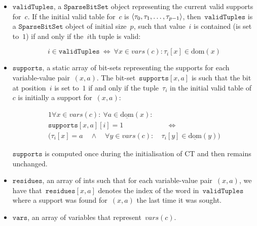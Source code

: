 \documentclass[a4paper,11pt]{article}
\newcommand{\Dom}[1]{\text{dom}({#1})}
\newcommand{\Dominit}[1]{\underline{\text{dom}}(#1)}
\newcommand{\SparseBitSet}{\texttt{SparseBitSet}}
\newcommand{\CurrTable}{\texttt{validTuples}}
\newcommand{\Supports}{\texttt{supports}}
\newcommand{\Residues}{\texttt{residues}}
\newcommand{\Vars}{\texttt{vars}}
\numberwithin{equation}{section}
\begin{document}
\begin{itemize}
  
  \item $\CurrTable$, a $\SparseBitSet$ object representing the current valid
    supports for~$c$. If the initial valid table for~$c$
    is $\left\langle\tau_0, \tau_1, \ldots, \tau_{p-1}\right\rangle$,
    then~$\CurrTable$ is a 
    $\SparseBitSet$ object of initial size~$p$, such that value~$i$
    is contained (is set to~$1$) if and only if the~$i$th tuple is valid:
    
    \begin{equation} \label{eq:currtable}
      i \in \CurrTable \ \Leftrightarrow \ \forall x \in \mathit{vars}(c): \tau_i[x] \in \Dom{x}
    \end{equation}

  \item $\Supports$, a static array of bit-sets representing
    the supports for each variable-value pair~$(x,a)$.
    The bit-set~$\Supports[x,a]$ is such that
    the bit at position~$i$ is set to~$1$ if and only if the 
    tuple~$\tau_i$ in the initial valid table of~$c$ is initially a support for~$(x,a)$:

    \begin{alignat}{1}
      \forall x \in \mathit{vars}(c): \ \forall a \in \Dominit{x}:& \\
      \Supports[x,a][i] = 1 &\quad \Leftrightarrow \\
      (\tau_i[x] = a \quad \land \quad
      \forall y \in \mathit{vars}(c): \ &\tau_i[y] \in \Dominit{y})
    \end{alignat}

    $\Supports$ is computed once during the initialisation of CT and then
    remains unchanged.
    
  \item $\Residues$, an array of ints such that for each variable-value pair~$(x,a)$,
    we have that~$\Residues[x,a]$ denotes the index of the word in~$\CurrTable$
    where a support was found for~$(x,a)$ the last time it was sought.

  \item $\Vars$, an array of variables that represent~$\mathit{vars}(c)$.

\end{itemize}
\end{document}
